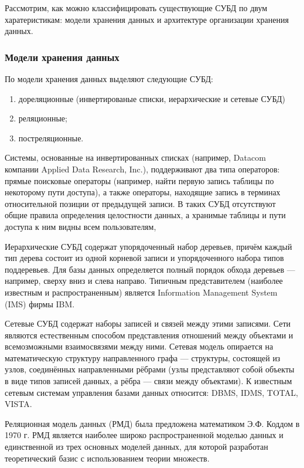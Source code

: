 Рассмотрим, как можно классифицировать существующие СУБД по двум харатеристикам: модели хранения данных и архитектуре организации хранения данных.

\subsubsection{Модели хранения данных}

По модели хранения данных выделяют следующие СУБД:

\begin{enumerate}[label=\arabic*)]
	\item дореляционные (инвертированые списки, иерархические и сетевые СУБД)
	\item реляционные;
	\item постреляционные.
\end{enumerate}

Системы, основанные на инвертированных списках (например, Datacom компании Applied Data Research, Inc.), поддерживают два типа операторов: прямые поисковые операторы (например, найти первую запись таблицы по некоторому пути доступа), а также операторы, находящие запись в терминах относительной позиции от предыдущей записи.
В таких СУБД отсутствуют общие правила определения целостности данных, а хранимые таблицы и пути доступа к ним видны всем пользователям,

Иерархические СУБД содержат упорядоченный набор деревьев, причём каждый тип дерева состоит из одной корневой записи и упорядоченного набора типов поддеревьев.
Для базы данных определяется полный порядок обхода деревьев --- например, сверху вниз и слева направо. 
Типичным представителем (наиболее известным и распространенным) является Information Management System (IMS) фирмы IBM.

Сетевые СУБД содержат наборы записей и связей между этими записями. 
Сети являются естественным способом представления отношений между объектами и всемозможными взаимосвязями между ними.
Сетевая модель опирается на математическую структуру направленного графа --- структуры, состоящей из узлов, соединённых направленными рёбрами (узлы представляют собой объекты в виде типов записей данных, а рёбра --- связи между объектами).
К известным сетевым системам управления базами данных относится: DBMS, IDMS, TOTAL, VISTA.

Реляционная модель данных (РМД) была предложена математиком Э.Ф. Коддом в 1970 г. 
РМД является наиболее широко распространенной моделью данных и единственной из трех основных моделей данных, для которой разработан теоретический базис с использованием теории множеств.

